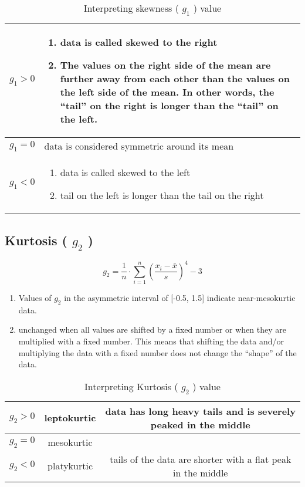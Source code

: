 \begin{table}
    \centering
    \begin{tabular}{|c|m{13cm}|}
        \hline
        $g_1 > 0$ & \vspace{0.5cm}\begin{enumerate}
            \item data is called skewed to the right
            \item The values on the right side of the mean are further away from each other than the values on the left side of the mean. In other words, the “tail” on the right is longer than the “tail” on the left.
        \end{enumerate}\vspace{-0.5cm} \\ \hline
        $g_1 = 0$ & data is considered symmetric around its mean \\ \hline
        $g_1 < 0$ & \vspace{0.5cm} \begin{enumerate}
            \item data is called skewed to the left
            \item tail on the left is longer than the tail on the right
        \end{enumerate} \vspace{-1cm} \\ \hline
    \end{tabular}
    \caption{Interpreting skewness ( $g_1$ ) value}
\end{table}

\subsection{Kurtosis ( $g_2$ ) \cite{ism-1}}\label{Kurtosis}
\[
    g_2 = \displaystyle\dfrac{1}{n} \cdot \sum_{i=1}^{n} \left( \dfrac{x_i - \bar{x}}{s} \right)^4 - 3
\]

\begin{enumerate}
    \item Values of $g_2$ in the asymmetric interval of [-0.5, 1.5] indicate near-mesokurtic data.
    \item unchanged when all values are shifted by a fixed number or when they are multiplied with a fixed number. This means that shifting the data and/or multiplying the data with a fixed number does not change the “shape” of the data.
\end{enumerate}

\begin{table}
    \centering
    \begin{tabular}{|c|c|c|}
        \hline
        $g_2 > 0$ & leptokurtic & data has long heavy tails and is severely peaked in the middle \\ \hline
        $g_2 = 0$ & mesokurtic & \\ \hline
        $g_2 < 0$ & platykurtic & tails of the data are shorter with a flat peak in the middle \\ \hline
    \end{tabular}
    \caption{Interpreting Kurtosis ( $g_2$ ) value}
\end{table}


